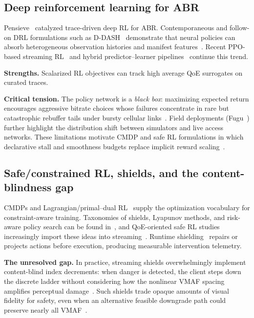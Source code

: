 \documentclass[preprint,12pt,times]{elsarticle}
\begin{document}
\subsection{Deep reinforcement learning for ABR}

Pensieve~\cite{mao2017neural} catalyzed trace-driven deep RL for ABR.
Contemporaneous and follow-on DRL formulations such as D-DASH~\cite{gadaleta2017ddash} demonstrate that neural policies can absorb heterogeneous observation histories and manifest features~\cite{sutton2018reinforcement}.
Recent PPO-based streaming RL~\cite{naresh2023ppoabr} and hybrid predictor--learner pipelines~\cite{liu2023hybrid} continue this trend.

\textbf{Strengths.} Scalarized RL objectives can track high average QoE surrogates on curated traces.

\textbf{Critical tension.} The policy network is a \emph{black box}: maximizing expected return encourages aggressive bitrate choices whose failures concentrate in rare but catastrophic rebuffer tails under bursty cellular links~\cite{yan2019learning,mao2017neural}.
Field deployments (Fugu~\cite{yan2019learning}) further highlight the distribution shift between simulators and live access networks.
These limitations motivate CMDP and safe RL formulations in which declarative stall and smoothness budgets replace implicit reward scaling~\cite{xiao2025qoe,tian2022towards}.

\subsection{Safe/constrained RL, shields, and the content-blindness gap}

CMDPs and Lagrangian/primal--dual RL~\cite{altman1999constrained,paternain2019dual,achiam2017constrained} supply the optimization vocabulary for constraint-aware training.
Taxonomies of shields, Lyapunov methods, and risk-aware policy search can be found in~\cite{tian2022towards,chow2018lyapunov}, and QoE-oriented safe RL studies increasingly import these ideas into streaming~\cite{xiao2025qoe}.
Runtime shielding~\cite{alshiekh2018shielding} repairs or projects actions before execution, producing measurable intervention telemetry.

\textbf{The unresolved gap.} In practice, streaming shields overwhelmingly implement content-blind index decrements: when danger is detected, the client steps down the discrete ladder without considering how the nonlinear VMAF spacing amplifies perceptual damage~\cite{li2016vmaf}.
Such shields trade opaque amounts of visual fidelity for safety, even when an alternative feasible downgrade path could preserve nearly all VMAF~\cite{xiao2025qoe,tian2022towards}.
\end{document}
